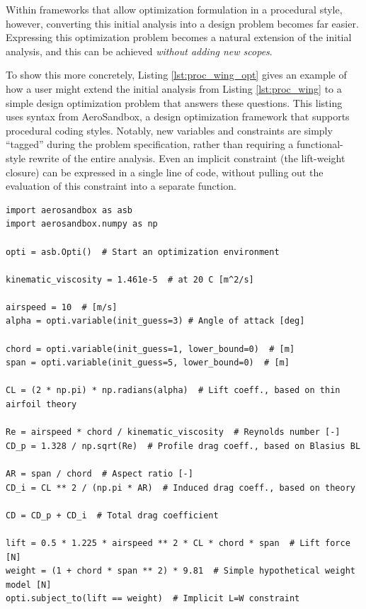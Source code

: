 \begin{enumerate}
    Within frameworks that allow optimization formulation in a procedural style, however, converting this initial analysis into a design problem becomes far easier. Expressing this optimization problem becomes a natural extension of the initial analysis, and this can be achieved \emph{without adding new scopes}.

    To show this more concretely, Listing \ref{lst:proc_wing_opt} gives an example of how a user might extend the initial analysis from Listing \ref{lst:proc_wing} to a simple design optimization problem that answers these questions. This listing uses syntax from AeroSandbox, a design optimization framework that supports procedural coding styles. Notably, new variables and constraints are simply ``tagged'' during the problem specification, rather than requiring a functional-style rewrite of the entire analysis. Even an implicit constraint (the lift-weight closure) can be expressed in a single line of code, without pulling out the evaluation of this constraint into a separate function.

    \begin{listing}[H]
        \begin{verbatim}
import aerosandbox as asb
import aerosandbox.numpy as np

opti = asb.Opti()  # Start an optimization environment

kinematic_viscosity = 1.461e-5  # at 20 C [m^2/s]

airspeed = 10  # [m/s]
alpha = opti.variable(init_guess=3) # Angle of attack [deg]

chord = opti.variable(init_guess=1, lower_bound=0)  # [m]
span = opti.variable(init_guess=5, lower_bound=0)  # [m]

CL = (2 * np.pi) * np.radians(alpha)  # Lift coeff., based on thin airfoil theory

Re = airspeed * chord / kinematic_viscosity  # Reynolds number [-]
CD_p = 1.328 / np.sqrt(Re)  # Profile drag coeff., based on Blasius BL

AR = span / chord  # Aspect ratio [-]
CD_i = CL ** 2 / (np.pi * AR)  # Induced drag coeff., based on theory

CD = CD_p + CD_i  # Total drag coefficient

lift = 0.5 * 1.225 * airspeed ** 2 * CL * chord * span  # Lift force [N]
weight = (1 + chord * span ** 2) * 9.81  # Simple hypothetical weight model [N]
opti.subject_to(lift == weight)  # Implicit L=W constraint


\end{verbatim}
\end{listing}
\end{enumerate}
